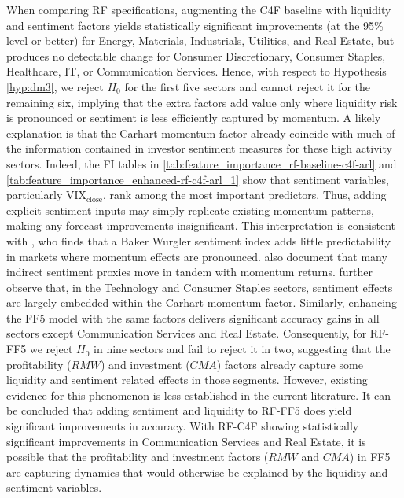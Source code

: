 When comparing RF specifications, augmenting the C4F baseline with liquidity and sentiment factors yields statistically significant improvements (at the 95\% level or better) for Energy, Materials, Industrials, Utilities, and Real Estate, but produces no detectable change for Consumer Discretionary, Consumer Staples, Healthcare, IT, or Communication Services. Hence, with respect to Hypothesis \ref{hyp:dm3}, we reject $H_{0}$ for the first five sectors and cannot reject it for the remaining six, implying that the extra factors add value only where liquidity risk is pronounced or sentiment is less efficiently captured by momentum. A likely explanation is that the Carhart momentum factor already coincide with much of the information contained in investor sentiment measures for these high activity sectors. Indeed, the FI tables in \cref{tab:feature_importance_rf-baseline-c4f-arl} and \cref{tab:feature_importance_enhanced-rf-c4f-arl_1} show that sentiment variables, particularly $\mathrm{VIX}_{\text{close}}$, rank among the most important predictors. Thus, adding explicit sentiment inputs may simply replicate existing momentum patterns, making any forecast improvements insignificant. This interpretation is consistent with , who finds that a Baker Wurgler sentiment index adds little predictability in markets where momentum effects are pronounced.  also document that many indirect sentiment proxies move in tandem with momentum returns.  further observe that, in the Technology and Consumer Staples sectors, sentiment effects are largely embedded within the Carhart momentum factor.  Similarly, enhancing the FF5 model with the same factors delivers significant accuracy gains in all sectors except Communication Services and Real Estate. Consequently, for RF-FF5 we reject $H_{0}$ in nine sectors and fail to reject it in two, suggesting that the profitability ($RMW$) and investment ($CMA$) factors already capture some liquidity and sentiment related effects in those segments. However, existing evidence for this phenomenon is less established in the current literature.  It can be concluded that adding sentiment and liquidity to RF-FF5 does yield significant improvements in accuracy. With RF-C4F showing statistically significant improvements in Communication Services and Real Estate, it is possible that the profitability and investment factors ($RMW$ and $CMA$) in FF5 are capturing dynamics that would otherwise be explained by the liquidity and sentiment variables.

